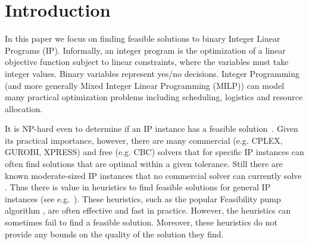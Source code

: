\nocite{IPbook}

\iffalse{
\section{Introduction}\label{chapter:intro}

In combinatorial optimization the aim is to find the optimal solution in a discrete and
usually finite yet large set of solutions. For many specific combinatorial optimization problems such a solution can be found efficiently. For many others, finding optimal or in many cases near optimal solutions is NP-hard. A common approach to deal with such problems is relaxing the discrete solution set into a continuous set, where the optimization problem becomes tractable. Obtaining feasible solutions by means of such a relaxation requires an additional step of rounding the potentially fractional solution of the continuous relaxation into integer solutions.
}\fi

\section{Introduction}
In this paper we focus on finding feasible solutions to binary Integer Linear Programs (IP). Informally, an integer program is the optimization of a linear objective function subject to linear constraints, where the variables must take integer values. Binary variables represent yes/no decisions. Integer Programming (and more generally Mixed Integer Linear Programming (MILP)) can model many practical optimization problems including scheduling, logistics and resource allocation.

It is  NP-hard even to determine if an IP instance has a feasible solution~\cite{GareyJohnson}. Given its practical importance, however, there are many commercial (e.g. CPLEX, GUROBI, XPRESS) and free (e.g. CBC) solvers that for specific IP instances can often find solutions that are optimal within a given tolerance. Still there are known moderate-sized IP instances that no commercial solver can currently solve \cite{MIPLIB}. Thus there is value in heuristics to find feasible solutions for general IP instances (see e.g.~\cite{HanafiT2017}).
These heuristics, such as the popular Feasibility pump algorithm \cite{fp1,fp2}, are often effective and fast in practice. However, the heuristics can sometimes fail to find a feasible solution. Moreover, these heuristics do not provide any bounds on the quality of the solution they find. 

